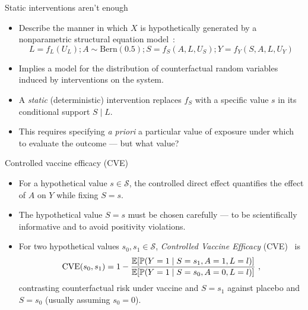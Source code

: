 \documentclass{beamer}
\begin{document}
\begin{frame}[c]{Static interventions aren't enough}

\begin{center}
\begin{itemize}
  \itemsep8pt
  \item Describe the manner in which $X$ is hypothetically generated by a
    nonparametric structural equation model~\citep{pearl2009causality}:
    \begin{equation*}
      L = f_L(U_L); A \sim \text{Bern}(0.5);
      S = f_S(A, L, U_S); Y = f_Y(S, A, L, U_Y)
    \end{equation*}
  \item Implies a model for the distribution of counterfactual random variables
    induced by interventions on the system.
  \item A \textit{static} (deterministic) intervention replaces $f_S$ with a
    specific value $s$ in its conditional support $S \mid L$.
  \item This requires specifying \textit{a priori} a particular value of
    exposure under which to evaluate the outcome --- but what value?
\end{itemize}
\end{center}

\note{
}

\end{frame}


\begin{frame}[c]{Controlled vaccine efficacy (CVE)}

\begin{center}
\begin{itemize}
  \itemsep8pt
  \item For a hypothetical value $s \in \mathcal{S}$, the controlled direct
    effect quantifies the effect of $A$ on $Y$ while fixing $S = s$.
  \item The hypothetical value $S = s$ must be chosen carefully --- to
    be scientifically informative and to avoid positivity violations.
  \item For two hypothetical values $s_0, s_1 \in \mathcal{S}$,
    \textit{Controlled Vaccine Efficacy} (CVE)~\citep{gilbert2022controlled} is
  \begin{equation*}
    \text{CVE}(s_0, s_1) = 1 -
      \frac{\mathbb{E}[\mathbb{P}(Y = 1 \mid S = s_1, A = 1, L = l)]}
      {\mathbb{E}[\mathbb{P}(Y = 1 \mid S = s_0, A = 0, L = l)]} \ ,
  \end{equation*}
  contrasting counterfactual risk under vaccine and $S = s_1$ against placebo
  and $S = s_0$ (usually assuming $s_0 = 0$).
\end{itemize}
\end{center}

\note{
}

\end{frame}
\end{document}
